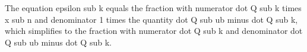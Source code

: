 The equation epsilon sub k equals the fraction with numerator dot Q sub k times x sub n and denominator 1 times the quantity dot Q sub ub minus dot Q sub k, which simplifies to the fraction with numerator dot Q sub k and denominator dot Q sub ub minus dot Q sub k.